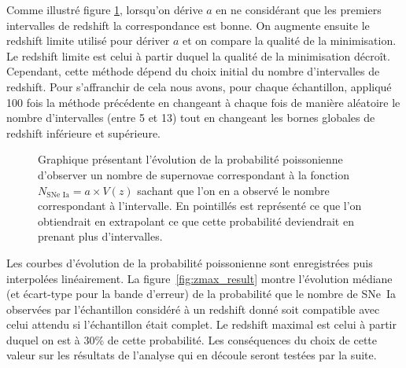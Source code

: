 \documentclass[a4paper, 12pt, svgnames]{article}
\begin{document}
Comme illustré figure \ref{fig:zmax_method}, lorsqu'on dérive $a$ en ne
considérant que les premiers intervalles de redshift la correspondance est
bonne. On augmente ensuite le redshift limite utilisé pour dériver $a$ et on
compare la qualité de la minimisation. Le redshift limite est celui à partir
duquel la qualité de la minimisation décroît. Cependant, cette méthode dépend du
choix initial du nombre d'intervalles de redshift. Pour s'affranchir de cela
nous avons, pour chaque échantillon, appliqué 100 fois la méthode précédente en
changeant à chaque fois de manière aléatoire le nombre d'intervalles (entre 5 et
13) tout en changeant les bornes globales de redshift inférieure et supérieure.
\bigbreak

\begin{figure}[htbp!]
    \centering
    \captionsetup{justification=centering}
    \caption{Graphique présentant l'évolution de la probabilité poissonienne
        d'observer un nombre de supernovae correspondant à la fonction
        $N_{\text{SNe~Ia}} = a\times V(z)$ sachant que l'on en a observé le
        nombre correspondant à l'intervalle. En pointillés est représenté ce
        que l'on obtiendrait en extrapolant ce que cette probabilité deviendrait
        en prenant plus d'intervalles.}
    \label{fig:zmax_method}
\end{figure}

Les courbes d'évolution de la probabilité poissonienne sont enregistrées puis
interpolées linéairement. La figure~\ref{fig:zmax_result} montre l'évolution
médiane (et écart-type pour la bande d'erreur) de la probabilité que le nombre
de SNe~Ia observées par l'échantillon considéré à un redshift donné soit
compatible avec celui attendu si l'échantillon était complet. Le redshift
maximal est celui à partir duquel on est à 30\% de cette probabilité. Les
conséquences du choix de cette valeur sur les résultats de l'analyse qui en
découle seront testées par la suite.
\end{document}
